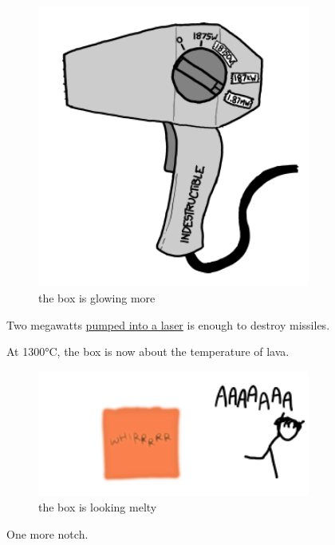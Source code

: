 \begin{figure}[!htbp]
\centering
\includegraphics[scale=0.5, max width=0.8\textwidth]{imgs/a/35/hair_dryer_1875000.png}
\caption{the box is glowing more}
\end{figure}

{Two megawatts \href{http://what-if.xkcd.com/13/}{pumped into a laser} is enough to destroy missiles.}

{At 1300°C, the box is now about the temperature of lava.}

\begin{figure}[!htbp]
\centering
\includegraphics[scale=0.5, max width=0.8\textwidth]{imgs/a/35/hair_dryer_box1500.png}
\caption{the box is looking melty}
\end{figure}

{One more notch.}

